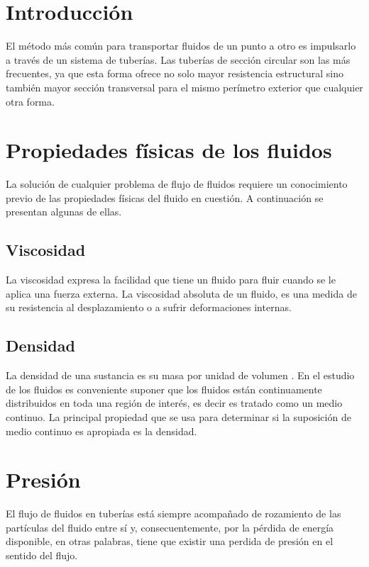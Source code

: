 \documentclass[11pt,letterpaper]{article}
\begin{document}
	\section{Introducción}
	
	El método más común para transportar fluidos de un punto a otro es impulsarlo a través de un sistema de tuberías. Las tuberías de sección circular son las más frecuentes, ya que esta forma ofrece no solo mayor resistencia estructural sino también mayor sección transversal para el mismo perímetro exterior que cualquier otra forma. \parencite[1.1]{crane}
	
	\section{Propiedades físicas de los fluidos}
	
	La solución de cualquier problema de flujo de fluidos requiere un conocimiento previo de las propiedades físicas del fluido en cuestión. A continuación se presentan algunas de ellas.
	
	\subsection{Viscosidad}
	
	La viscosidad expresa la facilidad que tiene un fluido para fluir cuando se le aplica una fuerza externa. La viscosidad absoluta de un fluido, es una medida de su resistencia al desplazamiento o  a sufrir deformaciones internas. \parencite[1.2]{crane}
	
	\subsection{Densidad}
	
	La densidad de una sustancia es su masa por unidad de volumen \parencite{crane}. En el estudio de los fluidos es conveniente suponer que los fluidos están continuamente distribuidos en toda una región de interés, es decir es tratado como un medio continuo. La principal propiedad que se usa para determinar si la suposición de medio continuo es apropiada es la densidad.\parencite[10]{merle}
	
	\section{Presión}
	
	El flujo de fluidos en tuberías está siempre acompañado de rozamiento de las partículas del fluido entre sí y, consecuentemente, por la pérdida de energía disponible, en otras palabras, tiene que existir una perdida de presión en el sentido del flujo. \parencite[1.7]{crane}
	
	\printbibliography[title={Referencias}]
	
\end{document}
